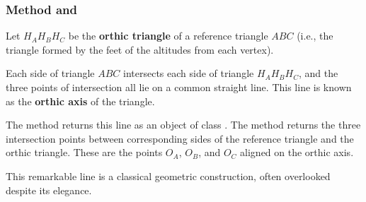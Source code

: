 \subsubsection{Method   and }
\label{ssub:method_triangle_orthic_axis}
\label{ssub:method_triangle_orthic_axis_points}

Let $H_AH_BH_C$ be the \textbf{orthic triangle} of a reference triangle $ABC$ (i.e., the triangle formed by the feet of the altitudes from each vertex).

\medskip

Each side of triangle $ABC$ intersects each side of triangle $H_AH_BH_C$, and the three points of intersection all lie on a common straight line. This line is known as the \textbf{orthic axis} of the triangle.

\medskip

The method  returns this line as an object of class .
The method  returns the three intersection points between corresponding sides of the reference triangle and the orthic triangle. These are the points $O_A$, $O_B$, and $O_C$ aligned on the orthic axis.

\medskip

This remarkable line is a classical geometric construction, often overlooked despite its elegance.

\vspace{1em}

\begin{tkzexample}[latex=.5\textwidth]
\begin{center}
\end{center}
\end{tkzexample}


